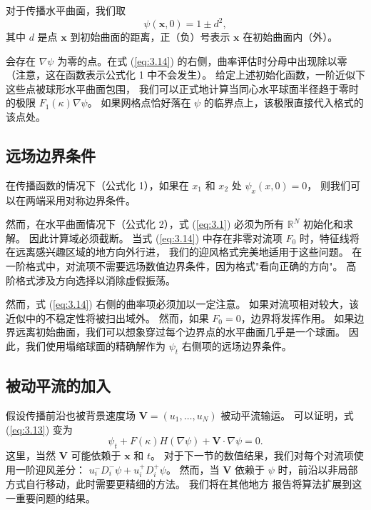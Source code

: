 \documentclass[11pt,a4paper]{article}
\begin{document}
对于传播水平曲面，我们取
\begin{equation}
\psi(\mathbf{x}, 0) = 1 \pm d^2,
\end{equation}
其中 $d$ 是点 $\mathbf{x}$ 到初始曲面的距离，正（负）号表示 $\mathbf{x}$ 在初始曲面内（外）。

会存在 $\nabla\psi$ 为零的点。在式 (\ref{eq:3.14}) 的右侧，曲率评估时分母中出现除以零
（注意，这在函数表示公式化 1 中不会发生）。
给定上述初始化函数，一阶近似下这些点被球形水平曲面包围，
我们可以正式地计算当同心水平球面半径趋于零时的极限 $F_1(\kappa)\nabla\psi$。
如果网格点恰好落在 $\psi$ 的临界点上，该极限直接代入格式的该点处。

\subsection{远场边界条件}

在传播函数的情况下（公式化 1），如果在 $x_1$ 和 $x_2$ 处 $\psi_x(x,0) = 0$，
则我们可以在两端采用对称边界条件。

然而，在水平曲面情况下（公式化 2），式 (\ref{eq:3.1}) 必须为所有 $\mathbb{R}^N$ 初始化和求解。
因此计算域必须截断。
当式 (\ref{eq:3.14}) 中存在非零对流项 $F_0$ 时，特征线将在远离感兴趣区域的地方向外行进，
我们的迎风格式完美地适用于这些问题。
在一阶格式中，对流项不需要远场数值边界条件，因为格式"看向正确的方向"。
高阶格式涉及方向选择以消除虚假振荡。

然而，式 (\ref{eq:3.14}) 右侧的曲率项必须加以一定注意。
如果对流项相对较大，该近似中的不稳定性将被扫出域外。
然而，如果 $F_0=0$，边界将发挥作用。
如果边界远离初始曲面，我们可以想象穿过每个边界点的水平曲面几乎是一个球面。
因此，我们使用塌缩球面的精确解作为 $\psi_t$ 右侧项的远场边界条件。

\subsection{被动平流的加入}

假设传播前沿也被背景速度场 $\mathbf{V} = (u_1, \ldots, u_N)$ 被动平流输运。
可以证明，式 (\ref{eq:3.13}) 变为
\begin{equation}
\psi_t + F(\kappa)H(\nabla\psi) + \mathbf{V} \cdot \nabla\psi = 0.
\label{eq:3.15}
\end{equation}
这里，当然 $\mathbf{V}$ 可能依赖于 $\mathbf{x}$ 和 $t$。
对于下一节的数值结果，我们对每个对流项使用一阶迎风差分：
$u_i^- D_i^-\psi + u_i^+ D_i^+\psi$。
然而，当 $\mathbf{V}$ 依赖于 $\psi$ 时，前沿以非局部方式自行移动，此时需要更精细的方法。
我们将在其他地方 \cite{sethian1988} 报告将算法扩展到这一重要问题的结果。
\end{document}
